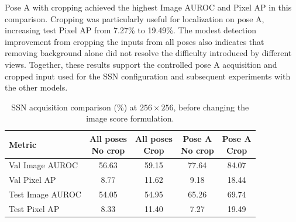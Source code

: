 Pose A with cropping achieved the highest Image AUROC and Pixel AP in this comparison. Cropping was particularly useful for localization on pose A, increasing test Pixel AP from 7.27\% to 19.49\%. The modest detection improvement from cropping the inputs from all poses also indicates that removing background alone did not resolve the difficulty introduced by different views. Together, these results support the controlled pose A acquisition and cropped input used for the SSN configuration and subsequent experiments with the other models.

\begin{table}[ht!]
    \centering
    \small
    \setlength{\tabcolsep}{5pt}
    \begin{tabular}{@{}l c c c c@{}}
        \toprule
        \textbf{Metric}  & \shortstack{\textbf{All poses}\\\textbf{No crop}} & \shortstack{\textbf{All poses}\\\textbf{Crop}} & \shortstack{\textbf{Pose A}\\\textbf{No crop}} & \shortstack{\textbf{Pose A}\\\textbf{Crop}} \\
        \midrule
        \midrule
        Val Image AUROC  & 56.63                                             & 59.15                                          & 77.64                                          & 84.07                                       \\
        Val Pixel AP     & 8.77                                              & 11.62                                          & 9.18                                           & 18.44                                       \\
        Test Image AUROC & 54.05                                             & 54.95                                          & 65.26                                          & 69.74                                       \\
        Test Pixel AP    & 8.33                                              & 11.40                                          & 7.27                                           & 19.49                                       \\
        \bottomrule
    \end{tabular}
    \vspace{5mm}
    \caption{SSN acquisition comparison (\%) at \(256\times256\), before changing the image score formulation.}
    \label{tab:damage-ssn-acquisition-ablation}
\end{table}

